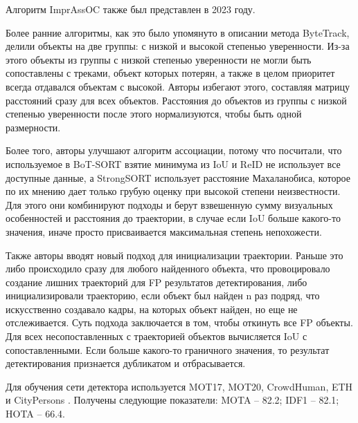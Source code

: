 Алгоритм ImprAssOC \cite{stadler2023improved} также был представлен в 2023 году. 

Более ранние алгоритмы, как это было упомянуто в описании метода ByteTrack, делили объекты на две группы: с низкой и высокой степенью уверенности. 
Из-за этого объекты из группы с низкой степенью уверенности не могли быть сопоставлены с треками, объект которых потерян, а также в целом приоритет всегда отдавался объектам с высокой. 
Авторы избегают этого, составляя матрицу расстояний сразу для всех объектов. Расстояния до объектов из группы с низкой степенью уверенности после этого нормализуются, чтобы быть одной размерности. 

Более того, авторы улучшают алгоритм ассоциации, потому что посчитали, что используемое в BoT-SORT взятие минимума из IoU и ReID не использует все доступные данные, а StrongSORT использует расстояние Махаланобиса, которое по их мнению дает только грубую оценку при высокой степени неизвестности.
Для этого они комбинируют подходы и берут взвешенную сумму визуальных особенностей и расстояния до траектории, в случае если IoU больше какого-то значения, иначе просто присваивается максимальная степень непохожести.

Также авторы вводят новый подход для инициализации траектории. Раньше это либо происходило сразу для любого найденного объекта, что провоцировало создание лишних траекторий для FP результатов детектирования, либо инициализировали траекторию, если объект был найден n раз подряд, что искусственно создавало кадры, на которых объект найден, но еще не отслеживается. 
Суть подхода заключается в том, чтобы откинуть все FP объекты. Для всех несопоставленных с траекторией объектов вычисляется IoU с сопоставленными. Если больше какого-то граничного значения, то результат детектирования признается дубликатом и отбрасывается. 

Для обучения сети детектора используется MOT17, MOT20, CrowdHuman, ETH и CityPersons \cite{zhang2017citypersons}. Получены следующие показатели: MOTA -- 82.2; IDF1 -- 82.1; HOTA -- 66.4.